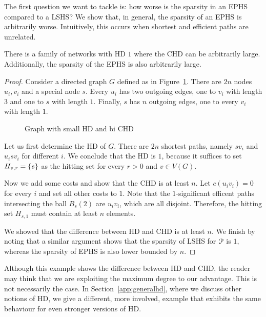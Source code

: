 The first question we want to tackle is: how worse is the sparsity in an EPHS compared to a LSHS?
We show that, in general, the sparsity of an EPHS is arbitrarily worse.
Intuitively, this occurs when shortest and efficient paths are unrelated. 

\begin{proposition}
There is a family of networks with HD $1$ where the CHD can be arbitrarily large.
Additionally, the sparsity of the EPHS is also arbitrarily large.
\end{proposition}
\begin{proof}
Consider a directed graph $G$ defined as in Figure~\ref{fig:big_chd}.
There are $2n$ nodes $u_i,v_i$ and a special node $s$.
Every $u_i$ has two outgoing edges, one to $v_i$ with length $3$ and one to $s$ with length $1$.
Finally, $s$ has $n$ outgoing edges, one to every $v_i$ with length $1$.

\begin{figure}\caption{Graph with small HD and bi CHD}\label{fig:big_chd}

\end{figure}

Let us first determine the HD of $G$.
There are $2n$ shortest paths, namely $sv_i$ and $u_isv_i$ for different $i$.
We conclude that the HD is $1$, because it suffices to set $H_{v,r}=\{s\}$ as the hitting set for every $r>0$ and $v\in V(G)$.

Now we add some costs and show that the CHD is at least $n$.
Let $c(u_iv_i)=0$ for every $i$ and set all other costs to $1$.
Note that the $1$-significant efficent paths intersecting the ball $B_s(2)$ are $u_iv_i$, which are all disjoint.
Therefore, the hitting set $H_{s,1}$ must contain at least $n$ elements.

We showed that the difference between HD and CHD is at least $n$.
We finish by noting that a similar argument shows that the sparsity of LSHS for $\mathcal{P}$ is $1$, whereas the sparsity of EPHS is also lower bounded by $n$.
\end{proof}

\begin{remark}
Although this example shows the difference between HD and CHD, the reader may think that we are exploiting the maximum degree to our advantage.
This is not necessarily the case. 
In Section~\ref{app:generalhd}, where we discuss other notions of HD, we give a different, more involved, example that exhibits the same behaviour for even stronger versions of HD.
\end{remark}

